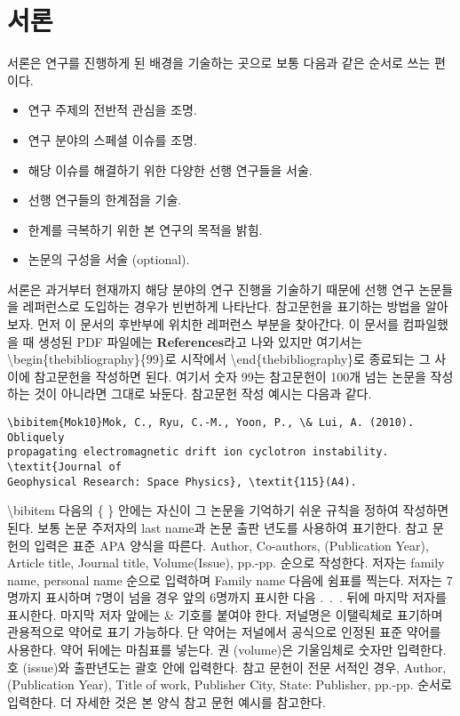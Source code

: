 \section{서론}

서론은 연구를 진행하게 된 배경을 기술하는 곳으로 보통 다음과 같은 순서로 쓰는 편이다.
\begin{itemize}
\item{연구 주제의 전반적 관심을 조명.}
\item{연구 분야의 스페셜 이슈를 조명.}
\item{해당 이슈를 해결하기 위한 다양한 선행 연구들을 서술.}
\item{선행 연구들의 한계점을 기술.}
\item{한계를 극복하기 위한 본 연구의 목적을 밝힘.}
\item{논문의 구성을 서술 (optional).}
\end{itemize}
서론은 과거부터 현재까지 해당 분야의 연구 진행을 기술하기 때문에 선행 연구 논문들을 레퍼런스로 도입하는 경우가 빈번하게 나타난다.  참고문헌을 표기하는 방법을 알아보자. 먼저 이 문서의 후반부에 위치한 레퍼런스 부분을 찾아간다. 이 문서를 컴파일했을 때 생성된 PDF 파일에는 {\bf References}라고 나와 있지만 여기서는 {\textbackslash}begin\{thebibliography\}\{99\}로 시작에서 {\textbackslash}end\{thebibliography\}로 종료되는 그 사이에 참고문헌을 작성하면 된다. 여기서 숫자 99는 참고문헌이 100개 넘는 논문을 작성하는 것이 아니라면 그대로 놔둔다. 참고문헌 작성 예시는 다음과 같다.
\begin{lstlisting}[breaklines=false]
\bibitem{Mok10}Mok, C., Ryu, C.-M., Yoon, P., \& Lui, A. (2010). Obliquely 
propagating electromagnetic drift ion cyclotron instability. \textit{Journal of 
Geophysical Research: Space Physics}, \textit{115}(A4).
\end{lstlisting}
{\textbackslash}bibitem 다음의 \{ \} 안에는 자신이 그 논문을 기억하기 쉬운 
규칙을 정하여 작성하면 된다. 보통 논문 주저자의 last name과 논문 출판 년도를 
사용하여 표기한다.
참고 문헌의 입력은 표준 APA 양식을 따른다. Author, Co-authors, (Publication 
Year), Article title, Journal title, Volume(Issue), pp.-pp. 순으로 작성한다. 
저자는 family name, personal name 순으로 입력하며 Family name 다음에 쉼표를 
찍는다. 저자는 7명까지 표시하며 7명이 넘을 경우 앞의 6명까지 표시한 다음 .~.~. 
뒤에 마지막 저자를 표시한다. 마지막 저자 앞에는 \& 기호를 붙여야 한다. 저널명은 
이탤릭체로 표기하며 관용적으로 약어로 표기 가능하다. 단 약어는 저널에서 
공식으로 인정된 표준 약어를 사용한다. 약어 뒤에는 마침표를 넣는다. 권 
(volume)은 기울임체로 숫자만 입력한다. 호 (issue)와 출판년도는 괄호 안에 
입력한다. 참고 문헌이 전문 서적인 경우, Author, (Publication Year), Title of 
work, Publisher City, State: Publisher, pp.-pp. 순서로 입력한다. 더 자세한 것은 
본 양식 참고 문헌 예시를 참고한다.

